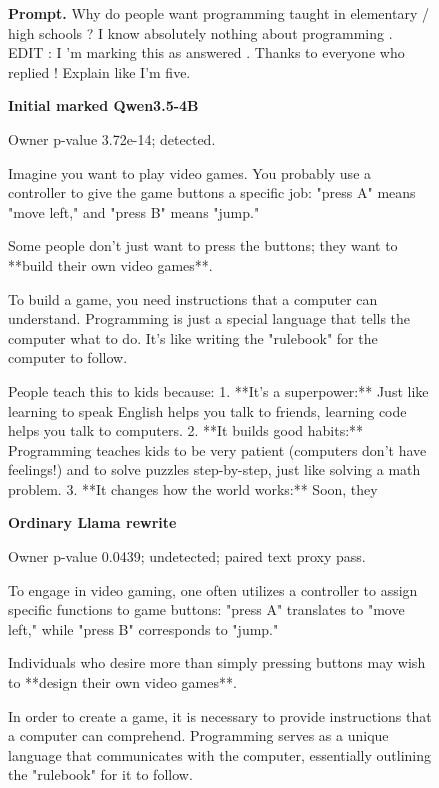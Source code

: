 \begin{figure}[p]\centering
\begin{minipage}{\linewidth}\footnotesize\textbf{Prompt.} Why do people want programming taught in elementary / high schools ? I know absolutely nothing about programming . EDIT : I 'm marking this as answered . Thanks to everyone who replied ! Explain like I'm five.
\end{minipage}\par\medskip
\begin{minipage}[t]{.315\linewidth}\raggedright\footnotesize
\textbf{Initial marked Qwen3.5-4B}\par\smallskip
Owner p-value 3.72e-14; detected.\par\medskip
Imagine you want to play video games. You probably use a controller to give the game buttons a specific job: "press A" means "move left," and "press B" means "jump."

Some people don't just want to press the buttons; they want to **build their own video games**.

To build a game, you need instructions that a computer can understand. Programming is just a special language that tells the computer what to do. It's like writing the "rulebook" for the computer to follow.

People teach this to kids because:
1.  **It's a superpower:** Just like learning to speak English helps you talk to friends, learning code helps you talk to computers.
2.  **It builds good habits:** Programming teaches kids to be very patient (computers don't have feelings!) and to solve puzzles step-by-step, just like solving a math problem.
3.  **It changes how the world works:** Soon, they
\end{minipage}
\hfill
\begin{minipage}[t]{.315\linewidth}\raggedright\footnotesize
\textbf{Ordinary Llama rewrite}\par\smallskip
Owner p-value 0.0439; undetected; paired text proxy pass.\par\medskip
To engage in video gaming, one often utilizes a controller to assign specific functions to game buttons: "press A" translates to "move left," while "press B" corresponds to "jump."

Individuals who desire more than simply pressing buttons may wish to **design their own video games**.

In order to create a game, it is necessary to provide instructions that a computer can comprehend. Programming serves as a unique language that communicates with the computer, essentially outlining the "rulebook" for it to follow.


\end{minipage}
\end{figure}
